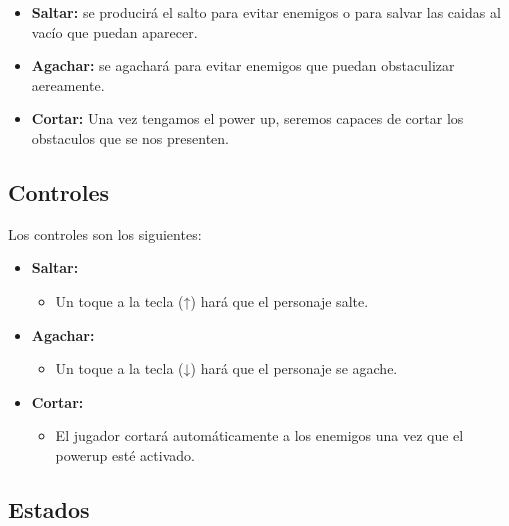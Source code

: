 \documentclass[palatino]{apuntes}
\begin{document}
\begin{itemize}
    \item \textbf{Saltar:} se producirá el salto para evitar enemigos o para salvar las caidas al vacío que puedan aparecer.
    \item \textbf{Agachar:} se agachará para evitar enemigos que puedan obstaculizar aereamente.
    \item \textbf{Cortar:} Una vez tengamos el power up, seremos capaces de cortar los obstaculos que se nos presenten.
\end{itemize}


\subsection{Controles}
Los controles son los siguientes:

\begin{itemize}
    \item \textbf{Saltar:}
        \begin{itemize}
            \item Un toque a la tecla (↑) hará que el personaje salte.
        \end{itemize}
    
\end{itemize}

\begin{itemize}
    \item \textbf{Agachar:}
        \begin{itemize}
            \item Un toque a la tecla (↓) hará que el personaje se agache.
        \end{itemize}
    
\end{itemize}

\begin{itemize}
    \item \textbf{Cortar:}
        \begin{itemize}
            \item El jugador cortará automáticamente a los enemigos una vez que el powerup esté activado.
        \end{itemize}
    
\end{itemize}


\subsection{Estados}
\end{document}
